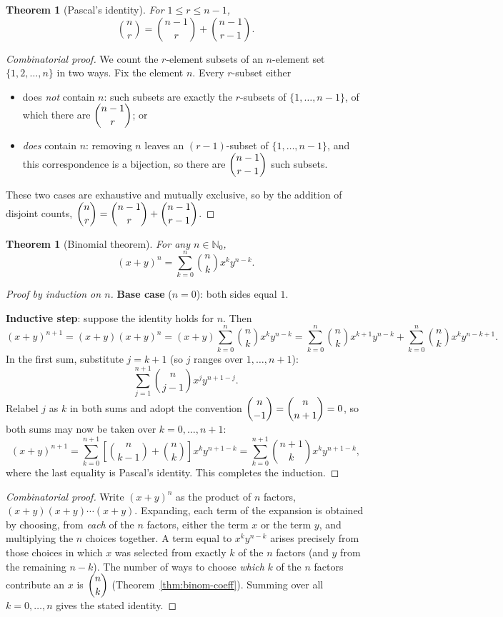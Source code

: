\documentclass[11pt]{article}
\theoremstyle{definition}
\theoremstyle{plain}
\newtheorem{theorem}[definition]{Theorem}
\theoremstyle{remark}
\newcommand{\Nz}{\mathbb{N}_0}
\begin{document}
\begin{theorem}[Pascal's identity]
For $1 \le r \le n-1$,
\[
\binom{n}{r} = \binom{n-1}{r} + \binom{n-1}{r-1}.
\]
\end{theorem}

\begin{proof}[Combinatorial proof]
We count the $r$-element subsets of an $n$-element set $\{1,2,\dots,n\}$ in two ways. Fix the
element $n$. Every $r$-subset either
\begin{itemize}
\item does \emph{not} contain $n$: such subsets are exactly the $r$-subsets of $\{1,\dots,n-1\}$,
of which there are $\dbinom{n-1}{r}$; or
\item \emph{does} contain $n$: removing $n$ leaves an $(r-1)$-subset of $\{1,\dots,n-1\}$, and
this correspondence is a bijection, so there are $\dbinom{n-1}{r-1}$ such subsets.
\end{itemize}
These two cases are exhaustive and mutually exclusive, so by the addition of disjoint counts,
$\dbinom{n}{r} = \dbinom{n-1}{r} + \dbinom{n-1}{r-1}$.
\end{proof}

\begin{theorem}[Binomial theorem]
\label{thm:binomial-thm}
For any $n \in \Nz$,
\[
(x+y)^n = \sum_{k=0}^n \binom{n}{k} x^k y^{n-k}.
\]
\end{theorem}

\begin{proof}[Proof by induction on $n$]
\textbf{Base case} ($n=0$): both sides equal $1$.

\textbf{Inductive step}: suppose the identity holds for $n$. Then
\[
(x+y)^{n+1} = (x+y)(x+y)^n = (x+y)\sum_{k=0}^n \binom{n}{k}x^k y^{n-k}
= \sum_{k=0}^n \binom{n}{k}x^{k+1}y^{n-k} + \sum_{k=0}^n \binom{n}{k}x^k y^{n-k+1}.
\]
In the first sum, substitute $j = k+1$ (so $j$ ranges over $1,\dots,n+1$):
\[
\sum_{j=1}^{n+1}\binom{n}{j-1}x^j y^{n+1-j}.
\]
Relabel $j$ as $k$ in both sums and adopt the convention $\dbinom{n}{-1}=\dbinom{n}{n+1}=0$, so
both sums may now be taken over $k=0,\dots,n+1$:
\[
(x+y)^{n+1} = \sum_{k=0}^{n+1}\left[\binom{n}{k-1}+\binom{n}{k}\right]x^k y^{n+1-k}
= \sum_{k=0}^{n+1}\binom{n+1}{k}x^k y^{n+1-k},
\]
where the last equality is Pascal's identity. This completes the induction.
\end{proof}

\begin{proof}[Combinatorial proof]
Write $(x+y)^n$ as the product of $n$ factors, $(x+y)(x+y)\cdots(x+y)$. Expanding, each term of
the expansion is obtained by choosing, from \emph{each} of the $n$ factors, either the term $x$
or the term $y$, and multiplying the $n$ choices together. A term equal to $x^k y^{n-k}$ arises
precisely from those choices in which $x$ was selected from exactly $k$ of the $n$ factors (and
$y$ from the remaining $n-k$). The number of ways to choose \emph{which} $k$ of the $n$ factors
contribute an $x$ is $\dbinom{n}{k}$ (Theorem~\ref{thm:binom-coeff}). Summing over all
$k=0,\dots,n$ gives the stated identity.
\end{proof}
\end{document}
